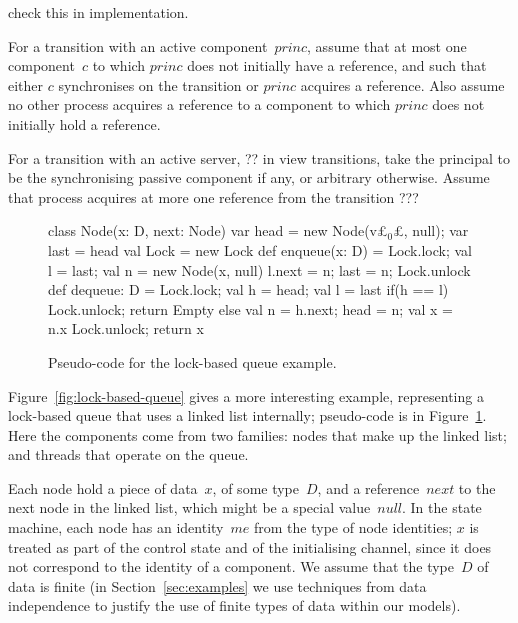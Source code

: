 \begin{improve}
check this in implementation.
\end{improve}

For a transition with an active component~$princ$, assume that at most one
component~$c$ to which $princ$ does not initially have a reference, and such
that either $c$ synchronises on the transition or $princ$ acquires a
reference.
%
Also assume no other process acquires a reference to a component to which
$princ$ does not initially hold a reference.  

For a transition with an active server, ?? in view transitions, take the
principal to be the synchronising passive component if any, or arbitrary
otherwise.  Assume that process acquires at more one reference from the
transition ??? 



\begin{figure}
\begin{scala}
class Node(x: D, next: Node)
var head = new Node(v£$_0$£, null); var last = head
val Lock = new Lock
def enqueue(x: D) = {
  Lock.lock; val l = last; val n = new Node(x, null) 
  l.next = n; last = n; Lock.unlock
}
def dequeue: D = {
  Lock.lock; val h = head; val l = last
  if(h == l){ Lock.unlock; return Empty }
  else{ val n = h.next; head = n; val x = n.x
        Lock.unlock; return x }
}
\end{scala}
\caption{Pseudo-code for the lock-based queue example.}
\label{fig:lock-based-queue-pseudocode}
\end{figure}


Figure~\ref{fig:lock-based-queue} gives a more interesting example,
representing a lock-based queue that uses a linked list internally;
pseudo-code is in Figure~\ref{fig:lock-based-queue-pseudocode}.  Here the
components come from two families: nodes that make up the linked list; and
threads that operate on the queue.  

Each node hold a piece of data~$x$, of some type~$D$, and a reference~$next$
to the next node in the linked list, which might be a special value~$null$.
In the state machine, each node has an identity~$me$ from the type of node
identities; $x$ is treated as part of the control state and of the
initialising channel, since it does not correspond to the identity of a
component.  We assume that the type~$D$ of data is finite (in
Section~\ref{sec:examples} we use techniques from data independence to justify
the use of finite types of data within our models).

